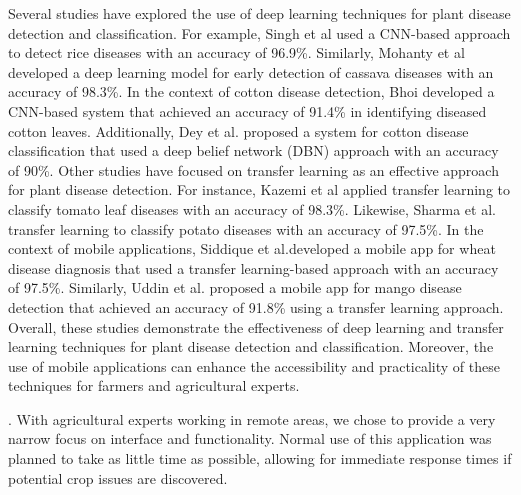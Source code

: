 \documentclass[conference]{IEEEtran}
\begin{document}
Several studies have explored the use of deep learning techniques for plant disease detection and classification. For example, Singh et al \cite{Singh-etal} used a CNN-based approach to detect rice diseases with an accuracy of 96.9\%. Similarly, Mohanty et al \cite{Mohanty-etal} developed a deep learning model for early detection of cassava diseases with an accuracy of 98.3\%. In the context of cotton disease detection, Bhoi \cite{Bhoi} developed a CNN-based system that achieved an accuracy of 91.4\% in identifying diseased cotton leaves. Additionally, Dey et al.\cite{Dey-etal} proposed a system for cotton disease classification that used a deep belief network (DBN) approach with an accuracy of 90\%. Other studies have focused on transfer learning as an effective approach for plant disease detection. For instance, Kazemi et al\cite{Kazemi-etal} applied transfer learning to classify tomato leaf diseases with an accuracy of 98.3\%. Likewise, Sharma et al.\cite{Sharma-etal} transfer learning to classify potato diseases with an accuracy of 97.5\%. In the context of mobile applications, Siddique et al.\cite{Siddique-etal}developed a mobile app for wheat disease diagnosis that used a transfer learning-based approach with an accuracy of 97.5\%. Similarly, Uddin et al.\cite {Uddin-etal} proposed a mobile app for mango disease detection that achieved an accuracy of 91.8\% using a transfer learning approach. 
Overall, these studies demonstrate the effectiveness of deep learning and transfer learning techniques for plant disease detection and classification. Moreover, the use of mobile applications can enhance the accessibility and practicality of these techniques for farmers and agricultural experts.


. With agricultural experts working in remote areas, we chose to provide a very narrow focus on interface and functionality. Normal use of this application was planned to take as little time as possible, allowing for immediate response times if potential crop issues are discovered. 

\end{document}
